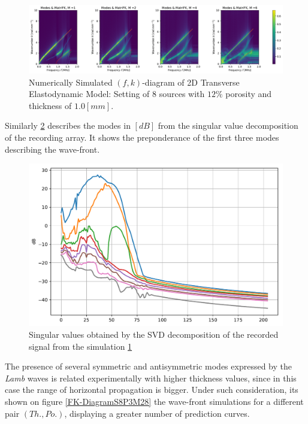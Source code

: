 \begin{figure}[!h]
	\centering
	\includegraphics[width=\textwidth]{images/TimeMultSous/2DTimeS8P12ElasticFK10M780_y.pdf}
	\caption{Numerically Simulated $(f,k)$-diagram of 2D Transverse Elastodynamic Model: Setting of 8 sources with $12\%$ porosity and thickness of $1.0 [mm]$.}
	\label{FK-DiagramS8P12M10}
\end{figure}

Similarly \ref{SVD-S8P12M10} describes the modes in $[dB]$ from the singular value decomposition of the recording array. It shows the preponderance of the first three modes describing the wave-front.

\begin{figure}[!h]
	\centering
	\includegraphics[scale=.5]{images/TimeMultSous/2DTimeS8P12Elastic10_SV.pdf}
	\caption{Singular values obtained by the SVD decomposition of the recorded signal from the simulation \ref{FK-DiagramS8P12M10}}
	\label{SVD-S8P12M10}
\end{figure}

The presence of several symmetric and antisymmetric modes expressed by the \textit{Lamb} waves is related experimentally with higher thickness values, since in this case the range of horizontal propagation is bigger.
Under such consideration, its shown on figure \ref{FK-DiagramS8P3M28} the wave-front simulations for a different pair $(Th., Po.)$, displaying a greater number of prediction curves.

